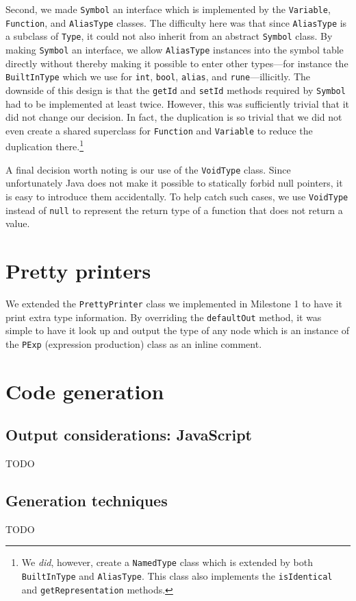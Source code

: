 \documentclass[oneside]{article}
\begin{document}
Second, we made \texttt{Symbol} an interface which is implemented by the \texttt{Variable}, \texttt{Function}, and \texttt{AliasType} classes. The difficulty here was that since \texttt{AliasType} is a subclass of \texttt{Type}, it could not also inherit from an abstract \texttt{Symbol} class. By making \texttt{Symbol} an interface, we allow \texttt{AliasType} instances into the symbol table directly without thereby making it possible to enter other types---for instance the \texttt{BuiltInType} which we use for \texttt{int}, \texttt{bool}, \texttt{alias}, and \texttt{rune}---illicitly. The downside of this design is that the \texttt{getId} and \texttt{setId} methods required by \texttt{Symbol} had to be implemented at least twice. However, this was sufficiently trivial that it did not change our decision. In fact, the duplication is so trivial that we did not even create a shared superclass for \texttt{Function} and \texttt{Variable} to reduce the duplication there.\footnote{We \emph{did}, however, create a \texttt{NamedType} class which is extended by both \texttt{BuiltInType} and \texttt{AliasType}. This class also implements the \texttt{isIdentical} and \texttt{getRepresentation} methods.}

A final decision worth noting is our use of the \texttt{VoidType} class. Since unfortunately Java does not make it possible to statically forbid null pointers, it is easy to introduce them accidentally. To help catch such cases, we use \texttt{VoidType} instead of \texttt{null} to represent the return type of a function that does not return a value.

\section{Pretty printers}

We extended the \verb|PrettyPrinter| class we implemented in Milestone 1 to have it print extra type information. By overriding the \verb|defaultOut| method, it was simple to have it look up and output the type of any node which is an instance of the \verb|PExp| (expression production) class as an inline comment.

\section{Code generation}
\subsection{Output considerations: JavaScript}

TODO

\subsection{Generation techniques}

TODO
\end{document}
